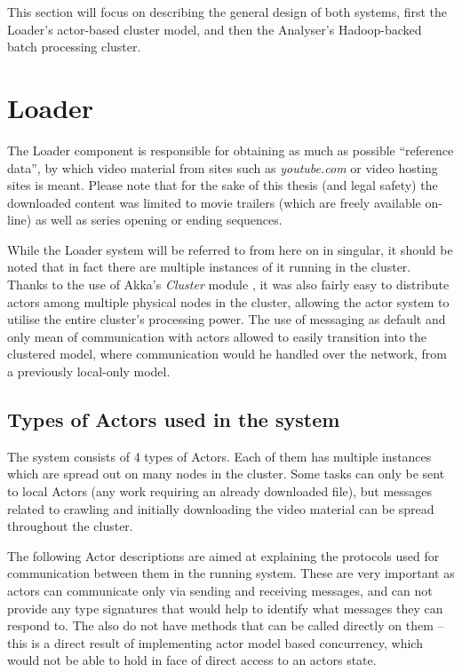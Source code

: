 This section will focus on describing the general design of both systems, first the Loader's actor-based cluster model, and then the Analyser's Hadoop-backed batch processing cluster.

\newpage
\section{Loader}
\label{sec:loader-basics}
The Loader component is responsible for obtaining as much as possible ``reference data'', by which video material from sites such as \textit{youtube.com} or video hosting sites is meant. Please note that for the sake of this thesis (and legal safety) the downloaded content was limited to movie trailers (which are freely available on-line) as well as series opening or ending sequences.

While the Loader system will be referred to from here on in singular, it should be noted that in fact there are multiple instances of it running in the cluster. Thanks to the use of Akka's \textit{Cluster} module \cite{akka-cluster}, it was also fairly easy to distribute actors among multiple physical nodes in the cluster, allowing the actor system to utilise the entire cluster's processing power. The use of messaging as default and only mean of communication with actors allowed to easily transition into the clustered model, where communication would he handled over the network, from a previously local-only model.

\subsection{Types of Actors used in the system}
\label{sec:types-of-actors}

The system consists of 4 types of Actors. Each of them has multiple instances which are spread out on many nodes in the cluster. Some tasks can only be sent to local Actors (any work requiring an already downloaded file), but messages related to crawling and initially downloading the video material can be spread throughout the cluster. 

The following Actor descriptions are aimed at explaining the protocols used for communication between them in the running system. These are very important as actors can communicate only via sending and receiving messages, and can not provide any type signatures that would help to identify what messages they can respond to. The also do not have methods that can be called directly on them -- this is a direct result of implementing actor model based concurrency, which would not be able to hold in face of direct access to an actors state.

